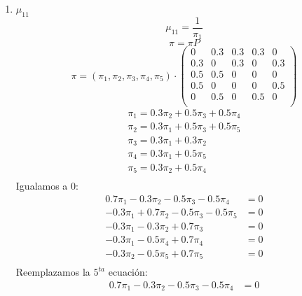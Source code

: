\documentclass{templateNote}
\begin{document}
\begin{enumerate}
    \begin{enumerate}[label=\alph*)]
        \item $\mu_{11}$
        \begin{equation*}
            \mu_{11} = \frac{1}{\pi_1}
        \end{equation*}
        \begin{equation*}
            \pi = \pi P
        \end{equation*}
        \begin{equation*}
            \pi = (\pi_1, \pi_2, \pi_3, \pi_4, \pi_5)
            \cdot
            \begin{pmatrix}
                0 & 0.3 & 0.3 & 0.3 & 0 \\
                0.3 & 0 & 0.3 & 0 & 0.3 \\
                0.5 & 0.5 & 0 & 0 & 0 \\
                0.5 & 0 & 0 & 0 & 0.5 \\
                0 & 0.5 & 0 & 0.5 & 0 \\
            \end{pmatrix}
        \end{equation*}
        \begin{align*}
            \pi_1 = 0.3\pi_2 + 0.5\pi_3 + 0.5\pi_4 \\
            \pi_2 = 0.3\pi_1 + 0.5\pi_3 + 0.5\pi_5 \\
            \pi_3 = 0.3\pi_1 + 0.3\pi_2 \\
            \pi_4 = 0.3\pi_1 + 0.5\pi_5 \\
            \pi_5 = 0.3\pi_2 + 0.5\pi_4 \\
        \end{align*}
        Igualamos a 0:
        \begin{align*}
            0.7\pi_1 - 0.3\pi_2 - 0.5\pi_3 - 0.5\pi_4 &= 0\\
            - 0.3\pi_1 + 0.7\pi_2 - 0.5\pi_3 - 0.5\pi_5 &= 0\\
            - 0.3\pi_1 - 0.3\pi_2 + 0.7\pi_3 &= 0\\
            - 0.3\pi_1 - 0.5\pi_4 + 0.7\pi_4 &= 0\\
            - 0.3\pi_2 - 0.5\pi_5 + 0.7\pi_5 &= 0\\
        \end{align*}
        Reemplazamos la $5^{ta}$ ecuación:
        \begin{align*}
            0.7\pi_1 - 0.3\pi_2 - 0.5\pi_3 - 0.5\pi_4 &= 0\\

\end{align*}
\end{enumerate}
\end{enumerate}
\end{document}

